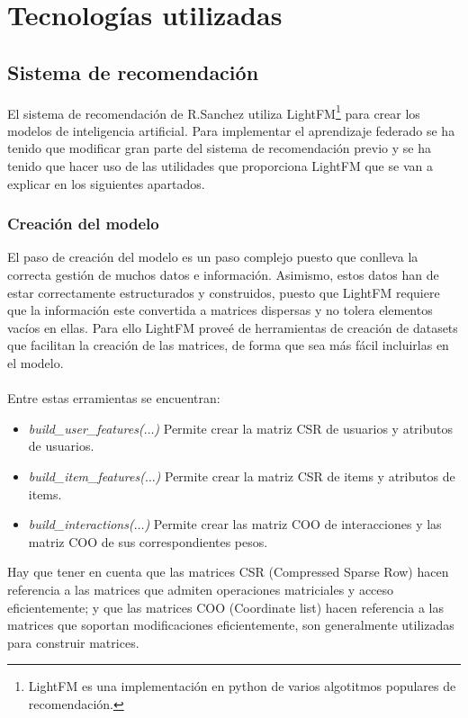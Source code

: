 \section{Tecnologías utilizadas}

\subsection{Sistema de recomendación}
El sistema de recomendación de R.Sanchez utiliza LightFM\footnote{LightFM es una implementación en python de varios algotitmos populares de recomendación.} para crear los modelos de inteligencia artificial. Para implementar el aprendizaje federado se ha tenido que modificar gran parte del sistema de recomendación previo y se ha tenido que hacer uso de las utilidades que proporciona LightFM que se van a explicar en los siguientes apartados. 
\subsubsection{Creación del modelo}
El paso de creación del modelo es un paso complejo puesto que conlleva la correcta gestión de muchos datos e información. Asimismo, estos datos han de estar correctamente estructurados y construidos, puesto que LightFM requiere que la información este convertida a matrices dispersas y no tolera elementos vacíos en ellas. Para ello LightFM proveé de herramientas de creación de datasets que facilitan la creación de las matrices, de forma que sea más fácil incluirlas en el modelo. 
\\ \\
Entre estas erramientas se encuentran:

\begin{itemize}
    \item \textit{build\_user\_features($\ldots$)} \quad Permite crear la matriz CSR de usuarios y atributos de usuarios.
    \item \textit{build\_item\_features($\ldots$)} \quad Permite crear la matriz CSR  de items y atributos de items.
    \item \textit{build\_interactions($\ldots$)} \quad Permite crear las matriz COO de interacciones y las matriz COO de sus correspondientes pesos.
\end{itemize}

Hay que tener en cuenta que las matrices CSR (Compressed Sparse Row) hacen referencia a las matrices que admiten operaciones matriciales y acceso eficientemente; y que las matrices COO (Coordinate list) hacen referencia a las matrices que soportan modificaciones eficientemente, son generalmente utilizadas para construir matrices.



